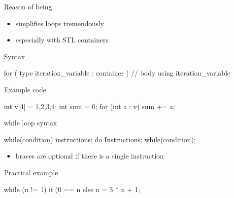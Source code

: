 \begin{frame}[fragile]
  \begin{block}{Reason of being}
    \begin{itemize}
    \item simplifies loops tremendously
    \item especially with STL containers
    \end{itemize}
  \end{block}
  \begin{block}{Syntax}
    \begin{cppcode*}{}
      for ( type iteration_variable : container ) {
        // body using iteration_variable
      }
    \end{cppcode*}
  \end{block}
  \begin{exampleblock}{Example code}
    \begin{cppcode*}{}
      int v[4] = {1,2,3,4};
      int sum = 0;
      for (int a : v) { sum += a; }
    \end{cppcode*}
  \end{exampleblock}
\end{frame}

\begin{frame}[fragile]
  \begin{block}{while loop syntax}
    \begin{cppcode*}{}
      while(condition) {
        instructions;
      }
      do {
        Instructions;
      } while(condition);
    \end{cppcode*}
    \vspace{-0.3cm}
    \begin{itemize}
      \item braces are optional if there is a single instruction
    \end{itemize}
  \end{block}
  \pause
  \begin{alertblock}{Practical example}
    \begin{cppcode*}{}
      while (n != 1)
        if (0 == n%
        else n = 3 * n + 1;
    \end{cppcode*}
  \end{alertblock}
\end{frame}

